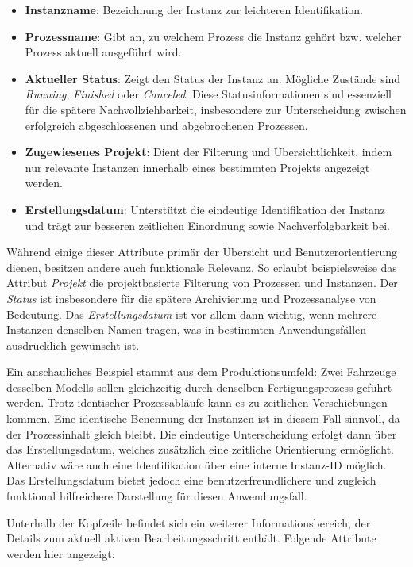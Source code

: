 \begin{itemize}
    \item \textbf{Instanzname}: Bezeichnung der Instanz zur leichteren Identifikation.
    \item \textbf{Prozessname}: Gibt an, zu welchem Prozess die Instanz gehört bzw. welcher Prozess aktuell ausgeführt wird.
    \item \textbf{Aktueller Status}: Zeigt den Status der Instanz an. Mögliche Zustände sind \textit{Running}, \textit{Finished} oder \textit{Canceled}. Diese Statusinformationen sind essenziell für die spätere Nachvollziehbarkeit, insbesondere zur Unterscheidung zwischen erfolgreich abgeschlossenen und abgebrochenen Prozessen.
    \item \textbf{Zugewiesenes Projekt}: Dient der Filterung und Übersichtlichkeit, indem nur relevante Instanzen innerhalb eines bestimmten Projekts angezeigt werden.
    \item \textbf{Erstellungsdatum}: Unterstützt die eindeutige Identifikation der Instanz und trägt zur besseren zeitlichen Einordnung sowie Nachverfolgbarkeit bei.
\end{itemize}

Während einige dieser Attribute primär der Übersicht und Benutzerorientierung dienen, besitzen andere auch funktionale Relevanz. So erlaubt beispielsweise das Attribut \textit{Projekt} die projektbasierte Filterung von Prozessen und Instanzen. Der \textit{Status} ist insbesondere für die spätere Archivierung und Prozessanalyse von Bedeutung. Das \textit{Erstellungsdatum} ist vor allem dann wichtig, wenn mehrere Instanzen denselben Namen tragen, was in bestimmten Anwendungsfällen ausdrücklich gewünscht ist. 

Ein anschauliches Beispiel stammt aus dem Produktionsumfeld: Zwei Fahrzeuge desselben Modells sollen gleichzeitig durch denselben Fertigungsprozess geführt werden. Trotz identischer Prozessabläufe kann es zu zeitlichen Verschiebungen kommen. Eine identische Benennung der Instanzen ist in diesem Fall sinnvoll, da der Prozessinhalt gleich bleibt. Die eindeutige Unterscheidung erfolgt dann über das Erstellungsdatum, welches zusätzlich eine zeitliche Orientierung ermöglicht. Alternativ wäre auch eine Identifikation über eine interne Instanz-ID möglich. Das Erstellungsdatum bietet jedoch eine benutzerfreundlichere und zugleich funktional hilfreichere Darstellung für diesen Anwendungsfall.

Unterhalb der Kopfzeile befindet sich ein weiterer Informationsbereich, der Details zum aktuell aktiven Bearbeitungsschritt enthält. Folgende Attribute werden hier angezeigt:

